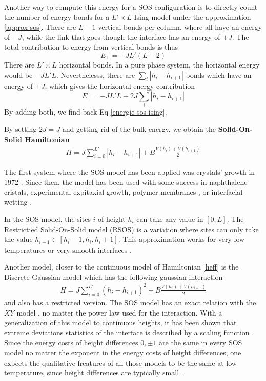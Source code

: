 Another way to compute this energy for a SOS configuration is to directly count the number of energy bonds for a $L'\times L$ Ising model under the approximation \eqref{approx-sos}. There are $L-1$ vertical bonds per column, where all have an energy of $-J$, while the link that goes though the interface has an energy of $+J$. The total contribution to energy from vertical bonds is thus 
\begin{equation}
    E_\perp = - J L' ( L-2)
\end{equation}
There are $L'\times L$ horizontal bonds. In a pure phase system, the horizontal energy would be $-JL'L$. Neverthelesss, there are $\sum_i |h_i-h_{i+1}|$ bonds which have an energy of $+J$, which gives the horizontal energy  contribution 
\begin{equation}
    E_\parallel = - J L' L + 2 J \sum_i |h_i-h_{i+1}|
\end{equation}
By adding both, we find back Eq \eqref{energie-sos-ising}.

By setting $2J=J$ and getting rid of the bulk energy, we obtain the \textbf{Solid-On-Solid Hamiltonian} 
\begin{align}
H = J \sum_{i=0}^{L'} |h_i-h_{i+1}| + B \frac{V(h_i)+V(h_{i+1})}{2}
\label{hamil-sos}
\end{align}



The first system where the SOS model has been applied was crystals' growth in 1972 \cite{gilmer_simulation_1972}. Since then, the model has been used with some success in naphthalene cristals\cite{elwenspoek_kinetic_1987}, experimental expitaxial growth\cite{wilby_scaling_1992}, polymer membranes \cite{boal_mechanics_2012,gompper_steric_1989}, or interfacial wetting \cite{fisher_walks_1983}.

In the SOS model, the sites $i$ of height $h_i$ can take any value in $[0,L]$. The Restrictied Solid-On-Solid model (RSOS) is a variation where sites can only take the value $h_{i+1} \in [h_i-1,h_i,h_i+1]$\cite{privman_transfer-matrix_1989}. This approximation works for very low temperatures or very smooth interfaces \cite{kim_conserved_1994,vaysburd_critical_1995}. 

Another model, closer to the continuous model of Hamiltonian \eqref{heff} is the Discrete Gaussian model which has the following gaussian interaction
\begin{align}
H = J \sum_{i=0}^{L'} (h_i-h_{i+1})^2 + B \frac{V(h_i)+V(h_{i+1})}{2}
\label{hamil-gsos}
\end{align} 
and also has a restricted version. The SOS model has an exact relation with the $XY$ model \cite{knops_exact_1977}, no matter the power law used for the interaction. With a generalization of this model to continuous heights, it has been shown that extreme deviations statistics of the interface is described by a scaling function \cite{schehr_universal_2006}. Since the energy costs of height differences $0,\pm 1$ are the same in every SOS model no matter the exponent  in the energy costs of height differences, one expects the qualitative freatures of all those models to be the same at low temperature, since height differences are typically small \cite{swendsen_monte_1977}.



